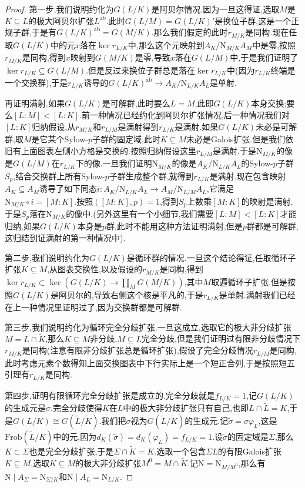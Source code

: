\begin{enumerate}
\begin{proof}
    	第一步,我们说明约化为$G(L/K)$是阿贝尔情况.因为一旦这得证,选取$M$是$K\subseteq L$的极大阿贝尔扩张$L^{\mathrm{ab}}$.此时$G(L/M)=G(L/K)'$是换位子群,这是一个正规子群,于是有$G(L/K)^{\mathrm{ab}}=G(M/K)$.那么我们假定的此时$r_{M/K}$是同构.现在任取$G(L/K)$中的元$x$落在$\ker r_{L/K}$中,那么这个元映射到$A_K/\mathrm{N}_{M/K}A_M$中是零,按照$r_{M/K}$是同构,得到$x$映射到$G(M/K)$是零,导致$x$落在$G(L/M)$中,于是我们证明了$\ker r_{L/K}\subseteq G(L/M)$.但是反过来换位子群总是落在$\ker r_{L/K}$中(因为$r_{L/K}$终端是一个交换群),于是$r_{L/K}$诱导的$G(L/K)^{\mathrm{ab}}\to A_K/\mathrm{N}_{L/K}A_L$是单射.
    	
    	再证明满射.如果$G(L/K)$是可解群,此时要么$L=M$,此即$G(L/K)$本身交换;要么$[L:M]<[L:K]$.前一种情况已经约化到阿贝尔扩张情况,后一种情况我们对$[L:K]$归纳假设,从$r_{M/K}$和$r_{L/M}$是满射得到$r_{L/K}$是满射.如果$G(L/K)$未必是可解群,取$M$是它某个Sylow-$p$子群的固定域,此时$K\subseteq M$未必是Galois扩张.但是我们依旧有上面图表左侧小方格是交换的.按照归纳假设这里$r_{L/M}$是满射.于是$\mathrm{N}_{M/K}$的像是$G(L/M)$在$r_{L/K}$下的像.一旦我们证明$\mathrm{N}_{M/K}$的像是$A_K/\mathrm{N}_{L/K}A_L$的Sylow-$p$子群$S_p$,结合交换群上所有Sylow-$p$子群生成整个群,就得到$r_{L/K}$是满射.现在包含映射$A_K\subseteq A_M$诱导了如下同态$i:A_K/\mathrm{N}_{L/K}A_L\to A_M/\mathrm{N}_{L/M}A_L$,它满足$\mathrm{N}_{M/K}\circ i=[M:K]$.按照$([M:K],p)=1$,得到$S_p$上数乘$[M:K]$的映射是满射,于是$S_p$落在$\mathrm{N}_{M/K}$的像中.(另外这里有一个小细节,我们需要$[L:M]<[L:K]$才能归纳,如果$G(L/K)$本身是$p$群,此时不能用这种方法证明满射,但是$p$群都是可解群,这归结到证满射的第一种情况中).
    	
    	第二步,我们说明约化为$G(L/K)$是循环群的情况.一旦这个结论得证,任取循环子扩张$K\subseteq M$,从图表交换性,以及假设的$r_{M/K}$是同构,得到$\ker r_{L/K}\subset\ker(G(L/K)\to\prod_MG(M/K))$,其中$M$取遍循环子扩张.但是按照$G(L/K)$是阿贝尔的,导致右侧这个核是平凡的,于是$r_{L/K}$是单射.满射我们已经在上一种情况里证明过了,因为交换群都是可解群.
    	
    	第三步,我们说明约化为循环完全分歧扩张.一旦这成立,选取它的极大非分歧扩张$M=L\cap\widetilde{K}$,那么$K\subseteq M$非分歧,$M\subseteq L$完全分歧,但是我们证明过有限非分歧情况下$r_{M/K}$是同构(注意有限非分歧扩张总是循环扩张),假设了完全分歧情况$r_{L/M}$是同构,此时考虑元素个数得知上面交换图表中下行实际上是一个短正合列,于是按照短五引理有$r_{L/K}$是同构.
    	
    	第四步,证明有限循环完全分歧扩张是成立的.完全分歧就是$f_{L/K}=1$,记$G(L/K)$的生成元是$\sigma$.完全分歧使得$K$在$L$中的极大非分歧扩张只有自己,也即$L\cap\widetilde{L}=K$,于是$G(L/K)\cong G(\widetilde{L}/\widetilde{K})$.我们把$\sigma$视为$G(\widetilde{L}/\widetilde{K})$的生成元.记$\widetilde{\sigma}=\sigma\varphi_L$,这是$\mathrm{Frob}(\widetilde{L}/K)$中的元,因为$d_K(\widetilde{\sigma})=d_K(\varphi_L)=f_{L/K}=1$.设$\widetilde{\sigma}$的固定域是$\Sigma$,那么$K\subset\Sigma$也是完全分歧扩张,于是$\Sigma\cap\widetilde{K}=K$.选取一个包含$\Sigma L$的有限Galois扩张$K\subseteq M$,选取$K\subseteq M$的极大非分歧扩张$M^0=M\cap\widetilde{K}$.记$\mathrm{N}=\mathrm{N}_{M/M^0}$,那么有$\mathrm{N}\mid A_{\Sigma}=\mathrm{N}_{\Sigma/K}$和$\mathrm{N}\mid A_L=\mathrm{N}_{L/K}$.
    	

\end{proof}
\end{enumerate}
